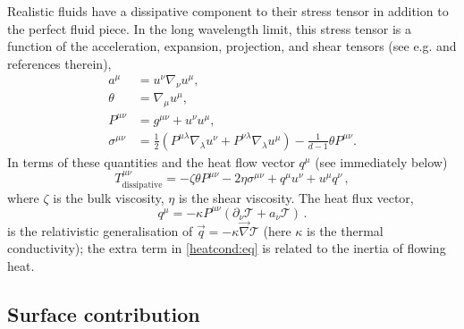 \documentclass[12pt,a4paper]{article}
\newcommand{\prn}[1]{\left ( #1 \right )}
\newcommand{\half}{\frac{1}{2}}
\newcommand{\p}{\partial}
\newcommand{\tloc}{\mathcal{T}}
\begin{document}
Realistic fluids have a dissipative component to their stress tensor
in addition to the perfect fluid piece. In the long wavelength
limit, this stress tensor is a function of  the acceleration,
expansion, projection, and shear tensors (see e.g. \cite[Exercise
22.6-7]{Misner+ThorneETAL-Grav:73} and references therein),
%
\begin{equation}\label{fluidtensors:eq}
\begin{split}
  a^\mu &= u^\nu \nabla_\nu u^\mu, \\
  \theta &= \nabla_\mu u^\mu, \\
  P^{\mu\nu} &= g^{\mu\nu} + u^\nu u^\mu, \\
  \sigma^{\mu\nu} &= \half \prn{P^{\mu\lambda} \nabla_\lambda u^\nu
                   + P^{\nu\lambda} \nabla_\lambda u^\mu}
                   - \frac{1}{d-1} \theta P^{\mu\nu}.%
\end{split}
\end{equation}
%
In terms of these quantities and the heat flow vector $q^\mu$ (see
immediately below)
%
\begin{equation}\label{extraTvisc:eq}
  T^{\mu\nu}_\mathrm{dissipative} = -\zeta \theta P^{\mu\nu} -
  2\eta\sigma^{\mu\nu} + q^\mu u^\nu + u^\mu q^\nu\,,
\end{equation}
%
where $\zeta$ is the bulk viscosity, $\eta$ is the shear viscosity.
The heat flux vector,
%
\begin{equation}\label{heatcond:eq}
  q^\mu = -\kappa P^{\mu\nu} (\p_\nu\tloc + a_\nu\tloc)\,.
\end{equation}
%
is the  relativistic generalisation of $\vec{q} = -\kappa
\vec{\nabla} \tloc$ (here $\kappa$ is the thermal conductivity); the
extra term in \eqref{heatcond:eq} is related to the inertia of
flowing heat.




\subsection{Surface contribution}\label{sec:srfstr}
\end{document}
